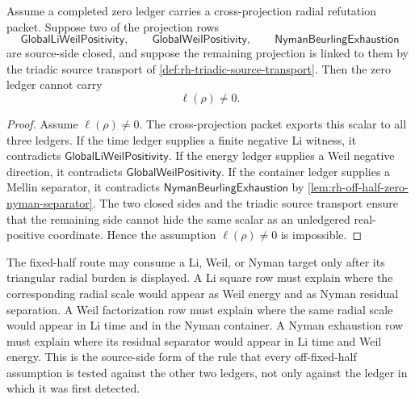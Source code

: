 \begin{theorem}
\label{thm:rh-two-sided-projection-audit-closes-third-side}
Assume a completed zero ledger carries a cross-projection radial
refutation packet.  Suppose two of the projection rows
$$
\mathsf{GlobalLiWeilPositivity},
\qquad
\mathsf{GlobalWeilPositivity},
\qquad
\mathsf{NymanBeurlingExhaustion}
$$
are source-side closed, and suppose the remaining projection is linked
to them by the triadic source transport of
\autoref{def:rh-triadic-source-transport}.  Then the zero ledger cannot
carry
$$
\ell(\rho)\ne0.
$$
\end{theorem}

\begin{proof}
Assume $\ell(\rho)\ne0$.  The cross-projection packet exports this
scalar to all three ledgers.  If the time ledger supplies a finite
negative Li witness, it contradicts
$\mathsf{GlobalLiWeilPositivity}$.  If the energy ledger supplies a
Weil negative direction, it contradicts
$\mathsf{GlobalWeilPositivity}$.  If the container ledger supplies a
Mellin separator, it contradicts $\mathsf{NymanBeurlingExhaustion}$ by
\autoref{lem:rh-off-half-zero-nyman-separator}.  The two closed sides
and the triadic source transport ensure that the remaining side cannot
hide the same scalar as an unledgered real-positive coordinate.  Hence
the assumption $\ell(\rho)\ne0$ is impossible.
\end{proof}

\begin{principle}
\label{prin:rh-no-single-projection-consumption}
The fixed-half route may consume a Li, Weil, or Nyman target only after
its triangular radial burden is displayed.  A Li square row must explain
where the corresponding radial scale would appear as Weil energy and as
Nyman residual separation.  A Weil factorization row must explain where
the same radial scale would appear in Li time and in the Nyman
container.  A Nyman exhaustion row must explain where its residual
separator would appear in Li time and Weil energy.  This is the
source-side form of the rule that every off-fixed-half assumption is
tested against the other two ledgers, not only against the ledger in
which it was first detected.
\end{principle}
